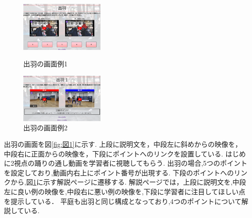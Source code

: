 \documentclass[twocolumn,10pt,a4j]{ltjsarticle}
\begin{document}
\begin{figure}[htbp]
 \begin{minipage}{0.5\hsize}
  \centering
  \includegraphics[width=42mm]{figures/zu11.png}
  \caption{出羽の画面例1}
   \label{fig:図1}
 \end{minipage}
 \begin{minipage}{0.5\hsize}
  \centering
  \includegraphics[width=42mm]{figures/zu12.png}
  \caption{出羽の画面例2}
   \label{fig:図2}
 \end{minipage}
\end{figure}

出羽の画面を図\ref{fig:図1}に示す.
上段に説明文を，中段左に斜めからの映像を，中段右に正面からの映像を，下段にポイントへのリンクを設置している.
はじめに2視点の踊りの通し動画を学習者に視聴してもらう.
出羽の場合,5つのポイントを設定しており,動画内右上にポイント番号が出現する.
下段のポイントへのリンクから,図\ref{fig:図2}に示す解説ページに遷移する.
解説ページでは，上段に説明文を,中段左に良い例の映像を,中段右に悪い例の映像を,下段に学習者に注目してほしい点を提示している．
平庭も出羽と同じ構成となっており,4つのポイントについて解説している.
\end{document}
